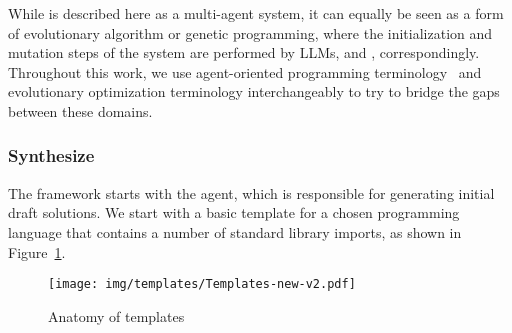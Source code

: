 While \method{} is described here as a multi-agent system, it can equally be seen as a form of evolutionary algorithm or genetic programming, where the initialization and mutation steps of the system are performed by LLMs, \synthmodelnoargs{} and \debugmodelnoargs{}, correspondingly.
Throughout this work, we use agent-oriented programming terminology~\cite{shoham1993:agentoriented} and evolutionary optimization terminology interchangeably to try to bridge the gaps between these domains.

\subsubsection{Synthesize}
\label{sec:synth}

The framework starts with the \synthesize{} agent, which is responsible for generating initial draft solutions.
We start with a basic template for a chosen programming language that contains a number of standard library imports, as shown in Figure~\ref{fig:template}.

\begin{figure}[t]
    \centering
    \texttt{[image: img/templates/Templates-new-v2.pdf]}
    \caption{Anatomy of \synthesize{} templates}
    \label{fig:template}
\end{figure}

